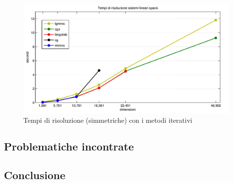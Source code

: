 \documentclass[11pt,a4paper]{scrartcl}
\begin{document}
\begin{figure}[!ht]
\centering
\includegraphics[scale=0.51]{images/tempi_iterativi} 
\caption{Tempi di risoluzione (simmetriche) con i metodi iterativi}
\label{tempi_iterativi}
\end{figure}

\subsection*{Problematiche incontrate}

\subsection*{Conclusione}
\end{document}
